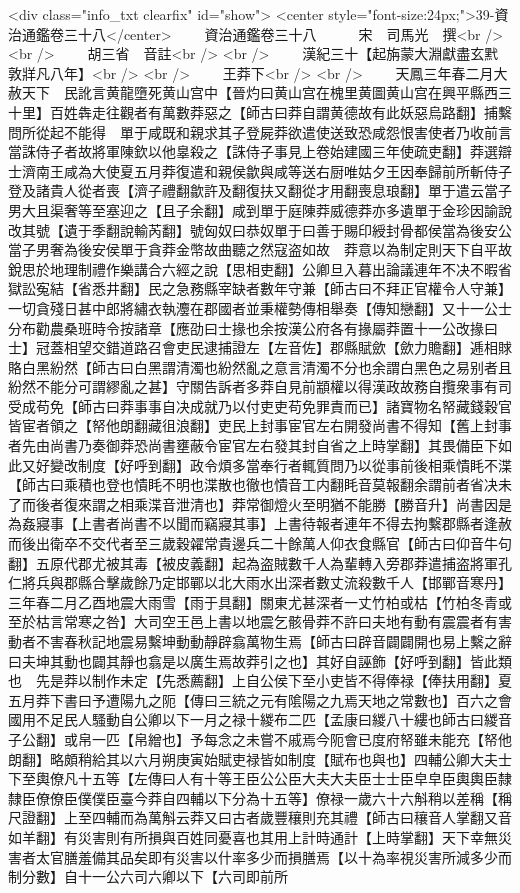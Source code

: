 <div class="info_txt clearfix" id="show">
<center style="font-size:24px;">39-資治通鑑卷三十八</center>
  　　資治通鑑卷三十八　　　宋　司馬光　撰<br />
<br />
　　胡三省　音註<br />
<br />
　　漢紀三十【起旃蒙大淵獻盡玄黓敦牂凡八年】<br />
<br />
　　王莽下<br />
<br />
　　天鳳三年春二月大赦天下　民訛言黄龍墮死黄山宫中【晉灼曰黄山宫在槐里黄圖黄山宫在興平縣西三十里】百姓犇走往觀者有萬數莽惡之【師古曰莽自謂黄德故有此妖惡烏路翻】捕繫問所從起不能得　單于咸既和親求其子登屍莽欲遣使送致恐咸怨恨害使者乃收前言當誅侍子者故將軍陳欽以他辠殺之【誅侍子事見上卷始建國三年使疏吏翻】莽選辯士濟南王咸為大使夏五月莽復遣和親侯歙與咸等送右厨唯姑夕王因奉歸前所斬侍子登及諸貴人從者喪【濟子禮翻歙許及翻復扶又翻從才用翻喪息琅翻】單于遣云當子男大且渠奢等至塞迎之【且子余翻】咸到單于庭陳莽威德莽亦多遺單于金珍因諭說改其號【遺于季翻說輸芮翻】號匈奴曰恭奴單于曰善于賜印綬封骨都侯當為後安公當子男奢為後安侯單于貪莽金幣故曲聽之然寇盗如故　莽意以為制定則天下自平故銳思於地理制禮作樂講合六經之說【思相吏翻】公卿旦入暮出論議連年不决不暇省獄訟寃結【省悉井翻】民之急務縣宰缺者數年守兼【師古曰不拜正官權令人守兼】一切貪殘日甚中郎將繡衣執灋在郡國者並秉權勢傳相舉奏【傳知戀翻】又十一公士分布勸農桑班時令按諸章【應劭曰士掾也余按漢公府各有掾屬莽置十一公改掾曰士】冠蓋相望交錯道路召會吏民逮捕證左【左音佐】郡縣賦歛【歛力贍翻】逓相賕賂白黑紛然【師古曰白黑謂清濁也紛然亂之意言清濁不分也余謂白黑色之易别者且紛然不能分可謂繆亂之甚】守關告訴者多莽自見前顓權以得漢政故務自攬衆事有司受成苟免【師古曰莽事事自决成就乃以付吏吏苟免罪責而已】諸寶物名帑藏錢穀官皆宦者領之【帑他朗翻藏徂浪翻】吏民上封事宦官左右開發尚書不得知【舊上封事者先由尚書乃奏御莽恐尚書壅蔽令宦官左右發其封自省之上時掌翻】其畏備臣下如此又好變改制度【好呼到翻】政令煩多當奉行者輒質問乃以從事前後相乘憒眊不渫【師古曰乘積也登也憒眊不明也渫散也徹也憒音工内翻眊音莫報翻余謂前者省决未了而後者復來謂之相乘渫音泄清也】莽常御燈火至明猶不能勝【勝音升】尚書因是為姦寢事【上書者尚書不以聞而竊寢其事】上書待報者連年不得去拘繫郡縣者逢赦而後出衛卒不交代者至三歲穀糴常貴邊兵二十餘萬人仰衣食縣官【師古曰仰音牛句翻】五原代郡尤被其毒【被皮義翻】起為盗賊數千人為輩轉入旁郡莽遣捕盗將軍孔仁將兵與郡縣合擊歲餘乃定邯鄲以北大雨水出深者數丈流殺數千人【邯鄲音寒丹】三年春二月乙酉地震大雨雪【雨于具翻】關東尤甚深者一丈竹柏或枯【竹柏冬青或至於枯言常寒之咎】大司空王邑上書以地震乞骸骨莽不許曰夫地有動有震震者有害動者不害春秋記地震易繫坤動動靜辟翕萬物生焉【師古曰辟音闢闢開也易上繫之辭曰夫坤其動也闢其靜也翕是以廣生焉故莽引之也】其好自誣飾【好呼到翻】皆此類也　先是莽以制作未定【先悉薦翻】上自公侯下至小吏皆不得俸禄【俸扶用翻】夏五月莽下書曰予遭陽九之阨【傳曰三統之元有隂陽之九焉天地之常數也】百六之會國用不足民人騷動自公卿以下一月之禄十緵布二匹【孟康曰緵八十縷也師古曰緵音子公翻】或帛一匹【帛繒也】予每念之未嘗不戚焉今阨會已度府帑雖未能充【帑他朗翻】略頗稍給其以六月朔庚寅始賦吏禄皆如制度【賦布也與也】四輔公卿大夫士下至輿僚凡十五等【左傳曰人有十等王臣公公臣大夫大夫臣士士臣皁皁臣輿輿臣隸隸臣僚僚臣僕僕臣臺今莽自四輔以下分為十五等】僚禄一歲六十六斛稍以差稱【稱尺證翻】上至四輔而為萬斛云莽又曰古者歲豐穰則充其禮【師古曰穰音人掌翻又音如羊翻】有災害則有所損與百姓同憂喜也其用上計時通計【上時掌翻】天下幸無災害者太官膳羞備其品矣即有災害以什率多少而損膳焉【以十為率視災害所減多少而制分數】自十一公六司六卿以下【六司即前所